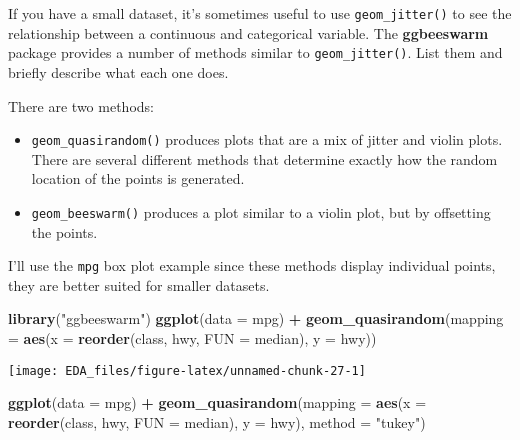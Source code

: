 \documentclass[]{book}
\newenvironment{Shaded}{\begin{snugshade}}{\end{snugshade}}
\newcommand{\DataTypeTok}[1]{\textcolor[rgb]{0.13,0.29,0.53}{#1}}
\newcommand{\KeywordTok}[1]{\textcolor[rgb]{0.13,0.29,0.53}{\textbf{#1}}}
\newcommand{\NormalTok}[1]{#1}
\newcommand{\OperatorTok}[1]{\textcolor[rgb]{0.81,0.36,0.00}{\textbf{#1}}}
\newcommand{\StringTok}[1]{\textcolor[rgb]{0.31,0.60,0.02}{#1}}
\providecommand{\tightlist}{%
  \setlength{\itemsep}{0pt}\setlength{\parskip}{0pt}}
\theoremstyle{plain}
\theoremstyle{remark}
\begin{document}
If you have a small dataset, it's sometimes useful to use
\texttt{geom\_jitter()} to see the relationship between a continuous and
categorical variable. The \textbf{ggbeeswarm} package provides a number
of methods similar to \texttt{geom\_jitter()}. List them and briefly
describe what each one does.

There are two methods:

\begin{itemize}
\tightlist
\item
  \texttt{geom\_quasirandom()} produces plots that are a mix of jitter
  and violin plots. There are several different methods that determine
  exactly how the random location of the points is generated.
\item
  \texttt{geom\_beeswarm()} produces a plot similar to a violin plot,
  but by offsetting the points.
\end{itemize}

I'll use the \texttt{mpg} box plot example since these methods display
individual points, they are better suited for smaller datasets.

\begin{Shaded}
\begin{Highlighting}[]
\KeywordTok{library}\NormalTok{(}\StringTok{"ggbeeswarm"}\NormalTok{)}
\KeywordTok{ggplot}\NormalTok{(}\DataTypeTok{data =}\NormalTok{ mpg) }\OperatorTok{+}
\StringTok{  }\KeywordTok{geom_quasirandom}\NormalTok{(}\DataTypeTok{mapping =} \KeywordTok{aes}\NormalTok{(}\DataTypeTok{x =} \KeywordTok{reorder}\NormalTok{(class, hwy, }\DataTypeTok{FUN =}\NormalTok{ median),}
                                 \DataTypeTok{y =}\NormalTok{ hwy))}
\end{Highlighting}
\end{Shaded}

\begin{center}\texttt{[image: EDA\_files/figure-latex/unnamed-chunk-27-1]} \end{center}

\begin{Shaded}
\begin{Highlighting}[]
\KeywordTok{ggplot}\NormalTok{(}\DataTypeTok{data =}\NormalTok{ mpg) }\OperatorTok{+}
\StringTok{  }\KeywordTok{geom_quasirandom}\NormalTok{(}\DataTypeTok{mapping =} \KeywordTok{aes}\NormalTok{(}\DataTypeTok{x =} \KeywordTok{reorder}\NormalTok{(class, hwy, }\DataTypeTok{FUN =}\NormalTok{ median),}
                                 \DataTypeTok{y =}\NormalTok{ hwy),}
                   \DataTypeTok{method =} \StringTok{"tukey"}\NormalTok{)}
\end{Highlighting}
\end{Shaded}
\end{document}
